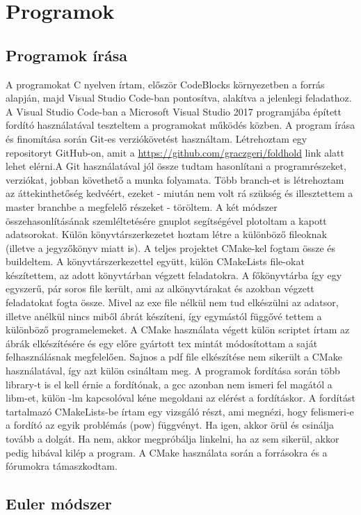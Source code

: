 \documentclass[a4paper, 12pt]{article}
\begin{document}
\section{Programok}
\label{sec:prog}

\subsection{Programok írása}
\label{progiras}

A programokat C nyelven írtam, először CodeBlocks környezetben a \cite{artic:negyedik} forrás alapján, majd Visual Studio Code-ban pontosítva, alakítva a jelenlegi feladathoz. A Visual Studio Code-ban a Microsoft Visual Studio 2017 programjába épített fordító használatával teszteltem a programokat működés közben. A program írása és finomítása során Git-es verziókövetést használtam. Létrehoztam egy repositoryt GitHub-on, amit a \url{https://github.com/graczgeri/foldhold} link alatt lehet elérni.A Git használatával jól össze tudtam hasonlítani a programrészeket, verziókat, jobban követhető a munka folyamata. Több branch-et is létrehoztam az áttekinthetőség kedvéért, ezeket - miután nem volt rá szükség és illesztettem a master branchbe a megfelelő részeket - töröltem. A két módszer összehasonlításának szemléltetésére gnuplot segítségével plotoltam a kapott adatsorokat. Külön könyvtárszerkezetet hoztam létre a különböző fileoknak (illetve a jegyzőkönyv miatt is). A teljes projektet CMake-kel fogtam össze és buildeltem. A könyvtárszerkezettel együtt, külön CMakeLists file-okat készítettem, az adott könyvtárban végzett feladatokra. A főkönyvtárba így egy egyszerű, pár soros file került, ami az alkönyvtárakat és azokban végzett feladatokat fogta össze. Mivel az exe file nélkül nem tud elkészülni az adatsor, illetve anélkül nincs miből ábrát készíteni, így egymástól függővé tettem a különböző programelemeket. A CMake használata végett külön scriptet írtam az ábrák elkészítésére és egy előre gyártott tex mintát módosítottam a saját felhasználásnak megfelelően. Sajnos a pdf file elkészítése nem sikerült a CMake használatával, így azt külön csináltam meg. A programok fordítása során több library-t is el kell érnie a fordítónak, a gcc azonban nem ismeri fel magától a libm-et, külön -lm kapcsolóval kéne megoldani az elérést a fordításkor. A fordítást tartalmazó CMakeLists-be írtam egy vizsgáló részt, ami megnézi, hogy felismeri-e a fordító az egyik problémás (pow) függvényt. Ha igen, akkor örül és csinálja tovább a dolgát. Ha nem, akkor megpróbálja linkelni, ha az sem sikerül, akkor pedig hibával kilép a program. A CMake használata során a \cite{artic:elso,artic:masodik} forrásokra és a \cite{artic:otodik,artic:hatodik} fórumokra támaszkodtam.\subsection{Euler módszer}
\label{subsec:euler_1}
\end{document}
